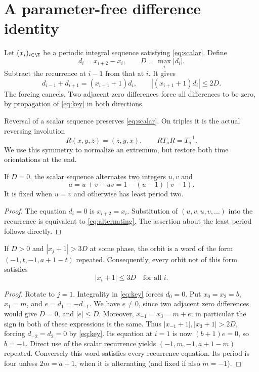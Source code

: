 \section{A parameter-free difference identity}
\label{sec:differences}

Let $(x_i)_{i\in\Z}$ be a periodic integral sequence satisfying
\eqref{eq:scalar}. Define
\begin{equation}
 d_i=x_{i+2}-x_i,\qquad D=\max_i|d_i|.
 \label{eq:difference}
\end{equation}
Subtract the recurrence at $i-1$ from that at $i$. It gives
\begin{equation}
 d_{i-1}+d_{i+1}=(x_{i+1}+1)d_i,
 \qquad |(x_{i+1}+1)d_i|\le2D.
 \label{eq:key}
\end{equation}
The forcing cancels. Two adjacent zero differences force all
differences to be zero, by propagation of \eqref{eq:key} in
both directions.

Reversal of a scalar sequence preserves \eqref{eq:scalar}.
On triples it is the actual reversing involution
\begin{equation}
 R(x,y,z)=(z,y,x),\qquad RT_aR=T_a^{-1}.
 \label{eq:reversor}
\end{equation}
We use this symmetry to normalize an extremum, but restore both
time orientations at the end.

\begin{lemma}
\label{lem:zero}
If $D=0$, the scalar sequence alternates two integers $u,v$ and
\begin{equation}
 a=u+v-uv=1-(u-1)(v-1).
 \label{eq:alternating}
\end{equation}
It is fixed when $u=v$ and otherwise has least period two.
\end{lemma}
\begin{proof}
The equation $d_i=0$ is $x_{i+2}=x_i$.
Substitution of $(u,v,u,v,\ldots)$ into the recurrence is
equivalent to \eqref{eq:alternating}. The assertion about the
least period follows directly.
\end{proof}

\begin{lemma}
\label{lem:height}
If $D>0$ and $|x_j+1|>3D$ at some phase, the orbit is a word
of the form $(-1,t,-1,a+1-t)$ repeated. Consequently, every
orbit not of this form satisfies
\begin{equation}
 |x_i+1|\le3D\quad\text{for all }i.
 \label{eq:heightbound}
\end{equation}
\end{lemma}
\begin{proof}
Rotate to $j=1$. Integrality in \eqref{eq:key} forces $d_0=0$.
Put $x_0=x_2=b$, $x_1=m$, and $e=d_1=-d_{-1}$.
We have $e\ne0$, since two adjacent zero differences would give
$D=0$, and $|e|\le D$. Moreover,
$x_{-1}=x_3=m+e$; in particular the sign in both of these
expressions is the same. Thus
$|x_{-1}+1|,|x_3+1|>2D$, forcing $d_{-2}=d_2=0$ by
\eqref{eq:key}. Its equation at $i=1$ is now $(b+1)e=0$,
so $b=-1$. Direct use of the scalar recurrence yields
$(-1,m,-1,a+1-m)$ repeated. Conversely this word satisfies
every recurrence equation. Its period is four unless
$2m=a+1$, when it is alternating (and fixed if also $m=-1$).
\end{proof}
